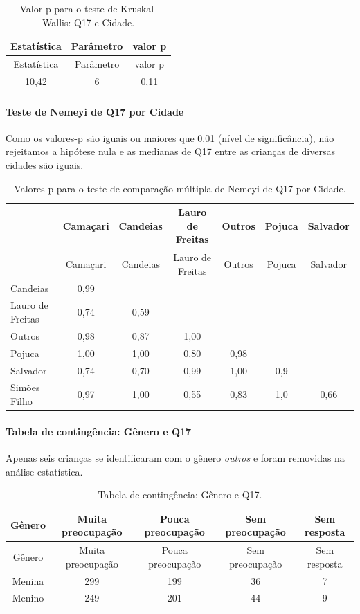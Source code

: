 \documentclass[]{article}
\let\oldparagraph\paragraph
\renewcommand{\paragraph}[1]{\oldparagraph{#1}\mbox{}}
\begin{document}
\begin{longtable}[]{@{}ccc@{}}
\caption{\label{tab:unnamed-chunk-196}Valor-p para o teste de Kruskal-Wallis: Q17 e Cidade.}\tabularnewline
\toprule
Estatística & Parâmetro & valor p\tabularnewline
\midrule
\endfirsthead
\toprule
Estatística & Parâmetro & valor p\tabularnewline
\midrule
\endhead
10,42 & 6 & 0,11\tabularnewline
\bottomrule
\end{longtable}

\hypertarget{teste-de-nemeyi-de-q17-por-cidade}{%
\paragraph{Teste de Nemeyi de Q17 por Cidade}\label{teste-de-nemeyi-de-q17-por-cidade}}

Como os valores-p são iguais ou maiores que 0.01 (nível de significância), não rejeitamos a hipótese nula e as medianas de Q17 entre as crianças de diversas cidades são iguais.

\begin{longtable}[]{@{}lcccccc@{}}
\caption{\label{tab:unnamed-chunk-198}Valores-p para o teste de comparação múltipla de Nemeyi de Q17 por Cidade.}\tabularnewline
\toprule
& Camaçari & Candeias & Lauro de Freitas & Outros & Pojuca & Salvador\tabularnewline
\midrule
\endfirsthead
\toprule
& Camaçari & Candeias & Lauro de Freitas & Outros & Pojuca & Salvador\tabularnewline
\midrule
\endhead
Candeias & 0,99 & & & & &\tabularnewline
Lauro de Freitas & 0,74 & 0,59 & & & &\tabularnewline
Outros & 0,98 & 0,87 & 1,00 & & &\tabularnewline
Pojuca & 1,00 & 1,00 & 0,80 & 0,98 & &\tabularnewline
Salvador & 0,74 & 0,70 & 0,99 & 1,00 & 0,9 &\tabularnewline
Simões Filho & 0,97 & 1,00 & 0,55 & 0,83 & 1,0 & 0,66\tabularnewline
\bottomrule
\end{longtable}

\cleardoublepage

\hypertarget{tabela-de-continguxeancia-guxeanero-e-q17}{%
\paragraph{Tabela de contingência: Gênero e Q17}\label{tabela-de-continguxeancia-guxeanero-e-q17}}

Apenas seis crianças se identificaram com o gênero \emph{outros} e foram removidas na análise estatística.

\begin{longtable}[]{@{}ccccc@{}}
\caption{\label{tab:unnamed-chunk-199}Tabela de contingência: Gênero e Q17.}\tabularnewline
\toprule
Gênero & Muita preocupação & Pouca preocupação & Sem preocupação & Sem resposta\tabularnewline
\midrule
\endfirsthead
\toprule
Gênero & Muita preocupação & Pouca preocupação & Sem preocupação & Sem resposta\tabularnewline
\midrule
\endhead
Menina & 299 & 199 & 36 & 7\tabularnewline
Menino & 249 & 201 & 44 & 9\tabularnewline
\bottomrule
\end{longtable}
\end{document}
